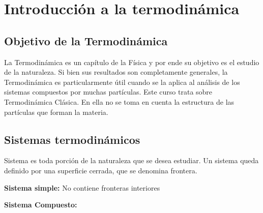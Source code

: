 \chapter[Indroducciónl]{Introducción a la termodinámica}
\begin{refsection}
\linespread{1}
\vspace{2cm}

\section{Objetivo de la Termodinámica}
La Termodinámica es un capítulo de la Física y por ende su objetivo es el estudio de la naturaleza. Si bien sus resultados son completamente generales, la Termodinámica es particularmente útil cuando se la aplica al análisis de los sistemas compuestos por muchas partículas. Este curso trata sobre Termodinámica Clásica. En ella no se toma en cuenta la estructura de las partículas que forman la materia.

\section{Sistemas termodinámicos}
Sistema es toda porción de la naturaleza que se desea estudiar. Un sistema queda definido por una superficie cerrada, que se denomina frontera.

{\bf Sistema simple:} No contiene fronteras interiores

{\bf Sistema Compuesto:}



\end{refsection}
